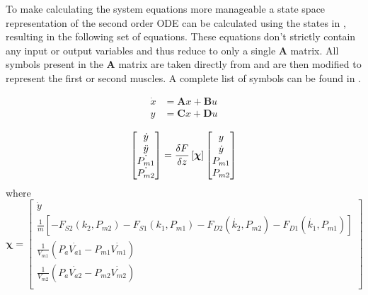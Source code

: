 \documentclass[11pt,a4paper]{article}
\begin{document}
To make calculating the system equations more manageable a state space representation  of the second order ODE can be calculated using the states in , resulting in the following set of equations. These equations don't strictly contain any input or output variables and thus reduce to only a single $\boldsymbol{A}$ matrix. All symbols present in the $\boldsymbol{A}$ matrix are taken directly from  and are then modified to represent the first or second muscles. A complete list of symbols can be found in .\newline

\begin{align}
    \label{math:state_space_representation}
    \dot{x} &= \boldsymbol{A}x + \boldsymbol{B}u\\
    y &= \boldsymbol{C}x + \boldsymbol{D}u\nonumber 
\end{align}

\begin{equation}
\begin{bmatrix}
        \dot{y}\\
        \ddot{y}\\
        \dot{P_{m1}}\\
        \dot{P_{m2}}\\
    \end{bmatrix}
    = \fdv{F}{z}\left[\boldsymbol{\chi}\right]
    \begin{bmatrix}
        y\\
        \dot{y}\\
        P_{m1}\\
        P_{m2}\\
    \end{bmatrix}
    \label{math:state_space_matrix}
\end{equation}
where
\begin{equation*}
        \boldsymbol{\chi} = 
    \begin{bmatrix}
        \dot{y}\\
        \frac{1}{m}[-F_{S2}(k_2,P_{m2})-F_{S1}(k_1,P_{m1})-F_{D2}(\dot{k_2},P_{m2})-F_{D1}(\dot{k_1},P_{m1})]\\
        \frac{1}{V_{m1}}(P_a\dot{V_{a1}}-P_{m1}\dot{V_{m1}})\\
        \frac{1}{V_{m2}}(P_a\dot{V_{a2}}-P_{m2}\dot{V_{m2}})\\
    \end{bmatrix}
\end{equation*}
\end{document}
